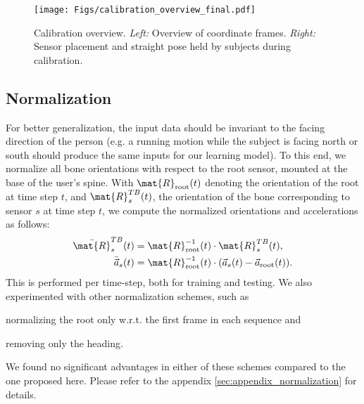 \documentclass[acmtog]{acmart}
\begin{document}
\begin{figure}
\centering
\texttt{[image: Figs/calibration\_overview\_final.pdf]}
\caption{Calibration overview. \emph{Left:} Overview of coordinate frames. \emph{Right:} Sensor placement and straight pose held by subjects during calibration.}
\label{fig:calib}
\end{figure}\subsection{Normalization}\label{sec:normalizattion}
For better generalization, the input data should be invariant to the facing direction of the person (e.g. a running motion while the subject is facing north or south should produce the same inputs for our learning model). To this end, we normalize all bone orientations with respect to the root sensor, mounted at the base of the user's spine. With $\mat{R}_\text{root}(t)$ denoting the orientation of the root at time step $t$, and $\mat{R}_s^{TB}(t)$, the orientation of the bone corresponding to sensor $s$ at time step $t$, we compute the normalized orientations and accelerations as follows:
\begin{align}
\bar{\mat{R}}^{TB}_s(t) &= \mat{R}_\text{root}^{-1}(t) \cdot \mat{R}^{TB}_s(t), \label{eq:ori_norm} \\
\bar{\vec{a}}_s(t) &= \mat{R}_\text{root}^{-1}(t)\cdot(\vec{a}_s(t) - \vec{a}_\text{root}(t)) . \label{eq:acc_norm}
\end{align}
This is performed per time-step, both for training and testing. We also experimented with other normalization schemes, such as 
\begin{inparaenum}[(i)]
\item normalizing the root only w.r.t. the first frame in each sequence and
\item removing only the heading.
\end{inparaenum}
We found no significant advantages in either of these schemes compared to the one proposed here. Please refer to the appendix \ref{sec:appendix_normalization} for details.
\end{document}
